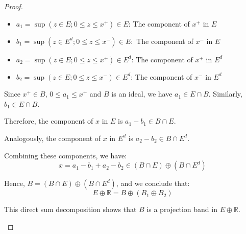 \documentclass{birkau}
\numberwithin{equation}{section}
\theoremstyle{plain}
\theoremstyle{definition}
\begin{document}
\begin{proof}
\begin{enumerate}
		
			\begin{itemize}
				\item $a_{1}=\sup \left( z\in E;0\leq z\leq x^{+}\right) \in E$: The
				component of $x^{+}$ in $E$
				
				\item $b_{1}=\sup \left( z\in E^{d};0\leq z\leq x^{-}\right) \in E:$ The
				component of $x^{-}$ in $E$
				
				\item $a_{2}=\sup \left( z\in E;0\leq z\leq x^{+}\right) \in E^{d}$: The
				component of $x^{+}$ in $E^{d}$
				
				\item $b_{2}=\sup \left( z\in E;0\leq z\leq x^{-}\right) \in E^{d}$: The
				component of $x^{-}$ in $E^{d}$
			\end{itemize}
	
		
		Since $x^{+}\in B$, $0\leq a_{1}\leq x^{+}$ and $B$ is an ideal, we have $%
		a_{1}\in E\cap B.$ Similarly, $b_{1}\in E\cap B.$ 
		
		Therefore,  the component of $x$ in $E$ is $a_{1}-b_{1}\in B\cap E.$
		
		Analogously,  the component of $x$ in $E^{d}$ is $a_{2}-b_{2}\in B\cap E^{d}.$
		
		Combining these components, we have:%
		\begin{equation*}
			x=a_{1}-b_{1}+a_{2}-b_{2}\in \left( B\cap E\right) \oplus \left( B\cap
			E^{d}\right) 
		\end{equation*}
		
	Hence, $B=\left( B\cap E\right) \oplus \left( B\cap E^{d}\right) $, and
		we conclude that:%
		\begin{equation*}
			E\oplus 
			\mathbb{R}
			=B\oplus \left( B_{1}\oplus B_{2}\right) 
		\end{equation*}
		
		This direct sum decomposition shows that $B$ is a projection band in $%
		E\oplus 
		\mathbb{R}
		$.
	\end{enumerate}
\end{proof}








\end{document}
